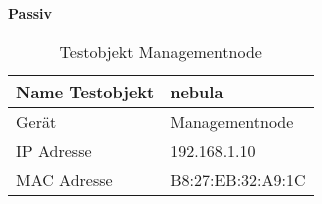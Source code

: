 \textbf{Passiv}
\begin{table}[H]
\centering
\begin{tabular}{|l|l|}
\hline
Name Testobjekt & nebula \\\hline
Gerät & Managementnode\\\hline
IP Adresse & 192.168.1.10 \\\hline
MAC Adresse & B8:27:EB:32:A9:1C \\\hline
\end{tabular}
\caption{Testobjekt Managementnode}
\end{table}